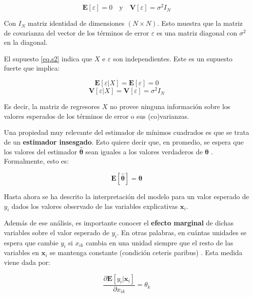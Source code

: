 \begin{equation}
    \bm{E}[\varepsilon]=0\quad\text{y}\quad\bm{V}[\varepsilon]=\sigma^2I_N
\end{equation}

Con $I_N$ matriz identidad de dimensiones $(N\times N)$. Esto muestra que la matriz de covarianza del vector de los términos de error $\varepsilon$ es una matriz diagonal con $\sigma^2$ en la diagonal.

El supuesto \eqref{eq.s2} indica que $X$ e $\varepsilon$ son independientes. Este es un supuesto fuerte que implica:

\begin{equation}
    \bm{E}[\varepsilon|X]=\bm{E}[\varepsilon]=0
\end{equation}
\begin{equation}
    \bm{V}[\varepsilon|X]=\bm{V}[\varepsilon]=\sigma^2I_N
\end{equation}

Es decir, la matriz de regresores $X$ no provee ninguna información sobre los valores esperados de los términos de error o sus (co)varianzas. 

Una propiedad muy relevante del estimador de mínimos cuadrados es que se trata de un \textbf{estimador insesgado}. Esto quiere decir que, en promedio, se espera que los valores del estimador $\bm{\hat\theta}$ sean iguales a los valores verdaderos de $\bm{\theta}$ \cite{verbeek}. Formalmente, esto es:

\begin{equation}
    \bm{E}[\hat{\bm{\theta}}] = \bm{\theta}
\end{equation}

Hasta ahora se ha descrito la interpretación del modelo para un valor esperado de $y_i$ dados los valores observado de las variables explicativas $\bm{x}_i$.

Además de ese análisis, es importante conocer el \textbf{efecto marginal} de dichas variables sobre el valor esperado de $y_i$. En otras palabras, en cuántas unidades se espera que cambie $y_i$ si $x_{ik}$ cambia en una unidad siempre que el resto de las variables en $\bm{x}_i$ se mantenga constante (condición ceteris paribus) \cite{hansen2018}. Esta medida viene dada por:

\begin{equation}
    \label{eq.efec_marginal}
    \frac{\partial \bm{E}[y_i|\bm{x}_i]}{\partial x_{ik}} =\theta_k
\end{equation}

